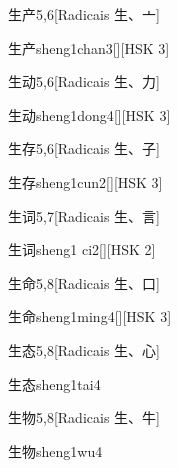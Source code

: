 \begin{entry}{生产}{5,6}[Radicais ⽣、⼇]
  \begin{phonetics}{生产}{sheng1chan3}[][HSK 3]
  \end{phonetics}
\end{entry}

\begin{entry}{生动}{5,6}[Radicais ⽣、⼒]
  \begin{phonetics}{生动}{sheng1dong4}[][HSK 3]
  \end{phonetics}
\end{entry}

\begin{entry}{生存}{5,6}[Radicais ⽣、⼦]
  \begin{phonetics}{生存}{sheng1cun2}[][HSK 3]
  \end{phonetics}
\end{entry}

\begin{entry}{生词}{5,7}[Radicais ⽣、⾔]
  \begin{phonetics}{生词}{sheng1 ci2}[][HSK 2]
  \end{phonetics}
\end{entry}

\begin{entry}{生命}{5,8}[Radicais ⽣、⼝]
  \begin{phonetics}{生命}{sheng1ming4}[][HSK 3]
  \end{phonetics}
\end{entry}

\begin{entry}{生态}{5,8}[Radicais ⽣、⼼]
  \begin{phonetics}{生态}{sheng1tai4}
  \end{phonetics}
\end{entry}

\begin{entry}{生物}{5,8}[Radicais ⽣、⽜]
  \begin{phonetics}{生物}{sheng1wu4}
  \end{phonetics}
\end{entry}

